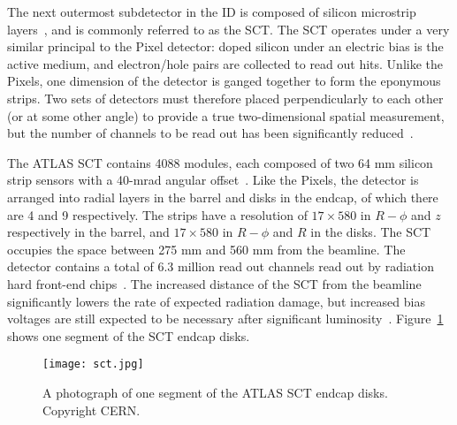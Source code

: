 The next outermost subdetector in the ID is composed of silicon microstrip layers~\cite{SCTPaper,ATLASPaper}, and is commonly referred to as the SCT.  The SCT operates under a very similar principal to the Pixel detector: doped silicon under an electric bias is the active medium, and electron/hole pairs are collected to read out hits. Unlike the Pixels, one dimension of the detector is ganged together to form the eponymous strips. Two sets of detectors must therefore placed perpendicularly to each other (or at some other angle) to provide a true two-dimensional spatial measurement, but the number of channels to be read out has been significantly reduced~\cite{Detectors}.

The ATLAS SCT contains 4088 modules, each composed of two 64 mm silicon strip sensors with a 40-mrad angular offset~\cite{ATLASPaper}. Like the Pixels, the detector is arranged into radial layers in the barrel and disks in the endcap, of which there are 4 and 9 respectively. The strips have a resolution of $17 \times 580$ in $R-\phi$ and $z$ respectively in the barrel, and $17 \times 580$ in $R-\phi$ and $R$ in the disks. The SCT occupies the space between 275 mm and 560 mm from the beamline. The detector contains a total of 6.3 million read out channels read out by radiation hard front-end chips~\cite{SCTReadout}. The increased distance of the SCT from the beamline significantly lowers the rate of expected radiation damage, but increased bias voltages are still expected to be necessary after significant luminosity~\cite{SCTPaper,ATLASPaper}.  Figure~\ref{fig:detector:sct} shows one segment of the SCT endcap disks.



\begin{figure}
\centering
\texttt{[image: sct.jpg]}
\caption{A photograph of one segment of the ATLAS SCT endcap disks. Copyright CERN.}
\label{fig:detector:sct}
\end{figure}


